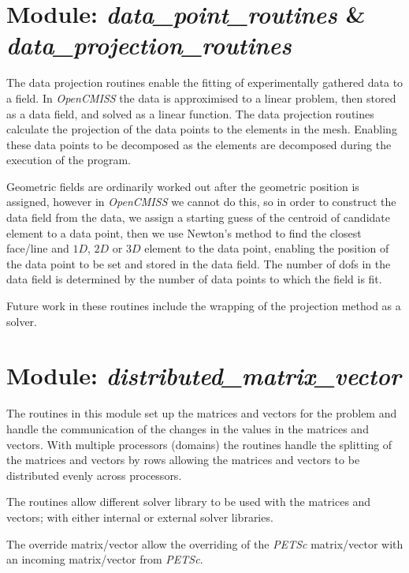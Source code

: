 \section{Module: \emph{data\_point\_routines} \&  \\ 
\emph{data\_projection\_routines}}
\label{sec:dataprojectionroutines}

The data projection routines enable the fitting of experimentally gathered 
data to a field. In \emph{OpenCMISS} the data is approximised to a linear 
problem, then stored as a data field, and solved as a linear function. The 
data projection routines calculate the projection of the data points to the 
elements in the mesh. Enabling these data points to be decomposed as the 
elements are decomposed during the execution of the program. 

Geometric fields are ordinarily worked out after the geometric position is 
assigned, however in \emph{OpenCMISS} we cannot do this, so in order to 
construct the data field from the data, we assign a starting guess of the 
centroid of candidate element to a data point, then we use Newton's method to 
find the closest face/line and $1D$, $2D$ or $3D$ element to the data point, 
enabling the position of the data point to be set and stored in the data field. 
The number of dofs in the data field is determined by the number of data points 
to which the field is fit.

Future work in these routines include the wrapping of the projection method
as a solver.


\section{Module: \emph{distributed\_matrix\_vector}}
\label{sec:distributedmatrixvector}

The routines in this module set up the matrices and vectors for the problem 
and handle the communication of the changes in the values in the matrices and 
vectors. With multiple processors (domains) the routines handle the splitting 
of the matrices and vectors by rows allowing the matrices and vectors to be
distributed evenly across processors. 

The routines allow different solver library to be used with the matrices and 
vectors; with either internal or external solver libraries.

The override matrix/vector allow the overriding of the \emph{PETSc}
matrix/vector with an incoming matrix/vector from \emph{PETSc}.

